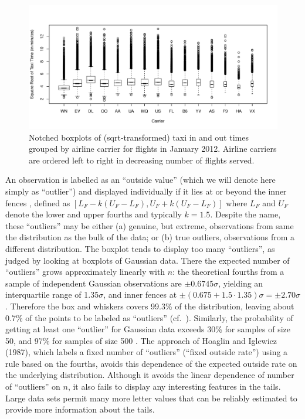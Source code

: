 \documentclass[12pt,oneside]{article}
\begin{document}
\begin{figure}[hbtp]
  \centering
  \includegraphics[width=\linewidth]{taxi-bp}

  \caption{Notched boxplots \citep{variations.boxplots} of (sqrt-transformed)
  taxi in and out times grouped by airline carrier for flights in January 2012. Airline carriers are ordered left to right in decreasing  number of flights served. }

  \label{fig:taxi-bp} 
\end{figure}

An observation is labelled as an ``outside value'' (which we will denote here
simply as ``outlier'') and displayed individually if it lies at or beyond the
inner fences \citep{eda,emerson83}, defined as $[L_F - k(U_F - L_F), U_F +
k(U_F - L_F)]$ where $L_F$ and $U_F$ denote the lower and upper fourths and
typically $k = 1.5$. Despite the name, these ``outliers'' may be either (a)
genuine, but extreme, observations from same the distribution as the bulk of
the data; or (b) true outliers, observations from a different distribution.
The boxplot tends to display too many ``outliers'', as judged by looking at
boxplots of Gaussian data. There the expected number of ``outliers'' grows
approximately linearly with $n$: the theoretical fourths from a sample of
independent Gaussian observations are $\pm 0.6745\sigma$, yielding an
interquartile range of 1.35$\sigma$, and inner fences at $\pm (0.675 + 1.5
\cdot 1.35)\sigma = \pm 2.70\sigma$. Therefore the box and whiskers covers
99.3\% of the distribution, leaving about 0.7\% of the points to be labeled as
``outliers'' (cf.~\citet{dchlv}). Similarly, the probability of getting at
least one ``outlier'' for Gaussian data exceeds 30\% for samples of size 50,
and 97\% for samples of size 500 \citep[pg. 1148]{dchbox}. The approach of Hoaglin and Iglewicz (1987), which labels a fixed
number of ``outliers'' (``fixed outside rate'') using a rule based
on the fourths, avoids this dependence of the expected outside rate on the 
underlying distribution.  Although it avoids the linear dependence of
number of ``outliers'' on $n$, it also fails to display any interesting
features in the tails.  Large data sets permit many more letter values
that can be reliably estimated to provide more information about the tails.
\end{document}
